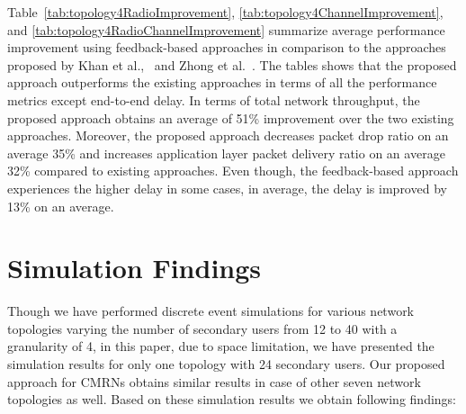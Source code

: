Table~\ref{tab:topology4RadioImprovement}, \ref{tab:topology4ChannelImprovement}, and \ref{tab:topology4RadioChannelImprovement} summarize average performance improvement using feedback-based approaches in comparison to the approaches proposed by Khan et al.,~\cite{khan2015towards} and Zhong et al.~\cite{zhong2014capacity}. The tables shows that the proposed approach outperforms the existing approaches in terms of all the performance metrics except end-to-end delay. In terms of total network throughput, the proposed approach obtains an average of 51\% improvement over the two existing approaches. Moreover, the proposed approach decreases packet drop ratio on an average 35\% and increases application layer packet delivery ratio on an average 32\% compared to existing approaches. Even though, the feedback-based approach experiences the higher delay in some cases, in average, the delay is improved by 13\% on an average.
%



\section{Simulation Findings}

Though we have performed discrete event simulations for various network topologies varying the number of secondary users from 12 to 40 with a granularity of 4, in this paper, due to space limitation, we have presented the simulation results for only one topology with 24 secondary users. Our proposed approach for CMRNs obtains similar results in case of other seven network topologies as well. Based on these simulation results we obtain following findings:

